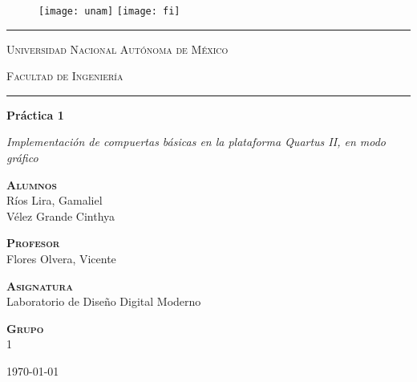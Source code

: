 \documentclass[../main.tex]{subfiles}
\begin{document}
\begin{titlepage}
  \begin{figure}[ht]
    \texttt{[image: unam]}
    \label{EscudoUNAM}
    \endminipage
    \texttt{[image: fi]}
    \label{EscudoFC}
    \endminipage
  \end{figure}

  \begin{center}
    \hrule height 0.5mm
    \vspace{0.2cm}
    \LARGE
    \textsc{Universidad Nacional Autónoma de México}

    \vfill
    \LARGE
    \textsc{Facultad de Ingeniería}
    \vspace{0.4cm}
    \hrule height 0.5mm

    \vfill
    \LARGE
    \textbf{Práctica 1}\\
    \vspace{0.8cm}
    \begin{minipage}{15cm}
      \centering
      \Large
      \textit{Implementación de compuertas básicas en la plataforma Quartus II, 
      en modo gráfico}
    \end{minipage}

    \vfill
    \large
    {\scshape \bfseries Alumnos}\\
    \vspace{.3cm}
    \large
    Ríos Lira, Gamaliel \\ Vélez Grande Cinthya

    \vfill
    \large
    {\scshape \bfseries Profesor}\\
    \vspace{.3cm}
    \large
    Flores Olvera, Vicente

    \vfill
    \large
    {\scshape \bfseries Asignatura}\\
    \vspace{.3cm}
    \large
    Laboratorio de Diseño Digital Moderno

    \vfill
    \large
    {\scshape \bfseries Grupo}\\
    \vspace{.3cm}
    \large
    1

    \vfill
    \today
  \end{center}
\end{titlepage}
\end{document}
